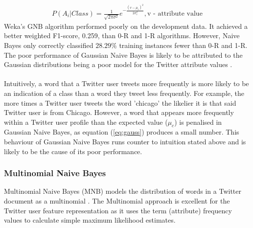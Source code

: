 \documentclass[11pt]{article}
\begin{document}
\begin{gather*}
P(A_i|Class) = \frac{1}{\sqrt{2\pi\sigma^{2}}}e^{-\frac{(v-\mu_c)^{2}}{2\sigma_c^{2}}}, \text{v - attribute value}
\tag{3}\label{eq:gauss}
\end{gather*}
Weka's GNB algorithm performed poorly on the development data. It achieved a better weighted F1-score, 0.259, than 0-R and 1-R algorithms. However, Naive Bayes only correctly classified $28.29\%$ training instances fewer than 0-R and 1-R. The poor performance of Gaussian Naive Bayes is likely to be attributed to the Gaussian distributions being a poor model for the Twitter attribute values \cite{john-naive}.\\\\
Intuitively, a word that a Twitter user tweets more frequently is more likely to be an indication of a class than a word they tweet less frequently. For example, the more times a Twitter user tweets the word 'chicago' the likelier it is that said Twitter user is from Chicago. However, a word that appears more frequently within a Twitter user profile than the expected value ($\mu_c$) is penalised in Gaussian Naive Bayes, as equation (\ref{eq:gauss}) produces a small number. This behaviour of Gaussian Naive Bayes runs counter to intuition stated above and is likely to be the cause of its poor performance. 

\subsubsection{Multinomial Naive Bayes}  

Multinomial Naive Bayes (MNB) models the distribution of words in a Twitter document as a multinomial \cite{ren-multi}. The Multinomial approach is excellent for the Twitter user feature representation as it uses the term (attribute) frequency values to calculate simple maximum likelihood estimates.
\end{document}
